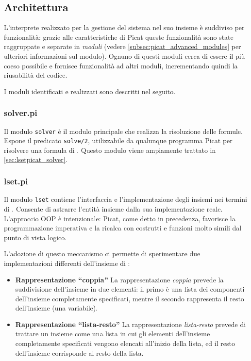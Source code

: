 \documentclass[12pt,a4paper,openright]{book} %
\begin{document}
\subsection{Architettura}
\label{subsec:lsetpicat_architecture}

L'interprete realizzato per la gestione del sistema nel suo insieme è
suddiviso per funzionalità: grazie alle caratteristiche di Picat
queste funzionalità sono state raggruppate e separate in \emph{moduli}
(vedere \ref{subsec:picat_advanced_modules} per ulteriori informazioni
sul modulo). Ognuno di questi moduli cerca di essere il più coeso
possibile e fornisce funzionalità ad altri moduli, incrementando
quindi la riusabilità del codice.

I moduli identificati e realizzati sono descritti nel seguito.

\subsubsection{solver.pi}

Il modulo \texttt{solver} è il modulo principale che realizza la
risoluzione delle formule. Espone il predicato \verb|solve/2|,
utilizzabile da qualunque programma Picat per risolvere una formula di
\lset{}. Questo modulo viene ampiamente trattato in
\ref{sec:lsetpicat_solver}.

\subsubsection{lset.pi}

Il modulo \texttt{lset} contiene l'interfaccia e l'implementazione
degli insiemi nei termini di \lset{}. Consente di astrarre l'entità
insieme dalla sua implementazione reale. L'approccio OOP è
intenzionale: Picat, come detto in precedenza, favorisce la
programmazione imperativa e la ricalca con costrutti e funzioni molto
simili dal punto di vista logico.

L'adozione di questo meccanismo ci permette di sperimentare due
implementazioni differenti dell'insieme di \lset{}:

\begin{itemize}
	\item \textbf{Rappresentazione ``coppia''} La rappresentazione
          \emph{coppia} prevede la suddivisione dell'insieme in due
          elementi: il primo è una lista dei componenti dell'insieme
          completamente specificati, mentre il secondo rappresenta il
          resto dell'insieme (una variabile).
	\item \textbf{Rappresentazione ``lista-resto''} La
          rappresentazione \emph{lista-resto} prevede di trattare un
          insieme come una lista in cui gli elementi dell'insieme
          completamente specificati vengono elencati all'inizio della
          lista, ed il resto dell'insieme corrisponde al resto della
          lista.
\end{itemize}
\end{document}
